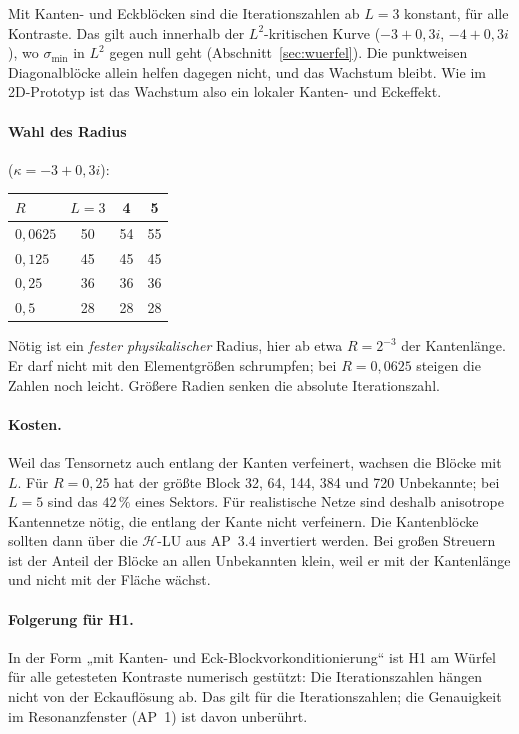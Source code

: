 \documentclass[11pt, a4paper]{article}
\begin{document}
Mit Kanten- und Eckblöcken sind die Iterationszahlen ab $L=3$ konstant, für alle
Kontraste. Das gilt auch innerhalb der $L^2$-kritischen Kurve ($-3+0{,}3i$, $-4+0{,}3i$),
wo $\sigma_{\min}$ in $L^2$ gegen null geht (Abschnitt~\ref{sec:wuerfel}). Die
punktweisen Diagonalblöcke allein helfen dagegen nicht, und das Wachstum bleibt. Wie
im 2D-Prototyp ist das Wachstum also ein lokaler Kanten- und Eckeffekt.

\paragraph{Wahl des Radius} ($\kappa=-3+0{,}3i$):
\begin{center}\small
\begin{tabular}{lccc}
\toprule
$R$ & $L=3$ & 4 & 5\\
\midrule
$0{,}0625$ & 50 & 54 & 55\\
$0{,}125$ & 45 & 45 & 45\\
$0{,}25$ & 36 & 36 & 36\\
$0{,}5$ & 28 & 28 & 28\\
\bottomrule
\end{tabular}
\end{center}
Nötig ist ein \emph{fester physikalischer} Radius, hier ab etwa $R=2^{-3}$ der
Kantenlänge. Er darf nicht mit den Elementgrößen schrumpfen; bei $R=0{,}0625$ steigen
die Zahlen noch leicht. Größere Radien senken die absolute Iterationszahl.

\paragraph{Kosten.} Weil das Tensornetz auch entlang der Kanten verfeinert, wachsen die
Blöcke mit $L$. Für $R=0{,}25$ hat der größte Block 32, 64, 144, 384 und 720
Unbekannte; bei $L=5$ sind das $42\,\%$ eines Sektors. Für realistische Netze sind
deshalb anisotrope Kantennetze nötig, die entlang der Kante nicht verfeinern. Die
Kantenblöcke sollten dann über die $\mathcal{H}$-LU aus AP~3.4 invertiert werden. Bei
großen Streuern ist der Anteil der Blöcke an allen Unbekannten klein, weil er mit der
Kantenlänge und nicht mit der Fläche wächst.

\paragraph{Folgerung für H1.} In der Form „mit Kanten- und Eck-Blockvorkonditionierung“
ist H1 am Würfel für alle getesteten Kontraste numerisch gestützt: Die Iterationszahlen
hängen nicht von der Eckauflösung ab. Das gilt für die Iterationszahlen; die
Genauigkeit im Resonanzfenster (AP~1) ist davon unberührt.
\end{document}
